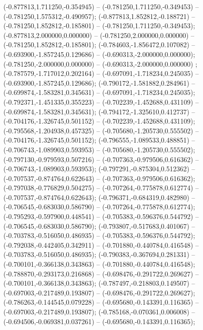 (-0.877813,1.711250,-0.354945) -- (-0.781250,1.711250,-0.349453) -- (-0.781250,1.575312,-0.490957);
 (-0.877813,1.852812,-0.188721) -- (-0.781250,1.852812,-0.185801) -- (-0.781250,1.711250,-0.349453);
 (-0.877813,2.000000,0.000000) -- (-0.781250,2.000000,0.000000) -- (-0.781250,1.852812,-0.185801);
 (-0.784603,-1.856472,0.107082) -- (-0.693900,-1.857245,0.129686) -- (-0.690313,-2.000000,0.000000);
 (-0.781250,-2.000000,0.000000) -- (-0.690313,-2.000000,0.000000) ;
 (-0.787579,-1.717012,0.202164) -- (-0.697091,-1.718234,0.245035) -- (-0.693900,-1.857245,0.129686);
 (-0.790172,-1.581882,0.284961) -- (-0.699874,-1.583281,0.345631) -- (-0.697091,-1.718234,0.245035);
 (-0.792371,-1.451335,0.355223) -- (-0.702239,-1.452688,0.431109) -- (-0.699874,-1.583281,0.345631);
 (-0.794172,-1.325610,0.412737) -- (-0.704176,-1.326745,0.501152) -- (-0.702239,-1.452688,0.431109);
 (-0.795568,-1.204938,0.457325) -- (-0.705680,-1.205730,0.555502) -- (-0.704176,-1.326745,0.501152);
 (-0.796555,-1.089533,0.488851) -- (-0.706743,-1.089903,0.593953) -- (-0.705680,-1.205730,0.555502);
 (-0.797130,-0.979593,0.507216) -- (-0.707363,-0.979506,0.616362) -- (-0.706743,-1.089903,0.593953);
 (-0.797291,-0.875304,0.512362) -- (-0.707537,-0.874764,0.622643) -- (-0.707363,-0.979506,0.616362);
 (-0.797038,-0.776829,0.504275) -- (-0.707264,-0.775878,0.612774) -- (-0.707537,-0.874764,0.622643);
 (-0.796371,-0.684319,0.482980) -- (-0.706545,-0.683030,0.586790) -- (-0.707264,-0.775878,0.612774);
 (-0.795293,-0.597900,0.448541) -- (-0.705383,-0.596376,0.544792) -- (-0.706545,-0.683030,0.586790);
 (-0.793807,-0.517683,0.401067) -- (-0.703783,-0.516050,0.486935) -- (-0.705383,-0.596376,0.544792);
 (-0.792038,-0.442405,0.342911) -- (-0.701880,-0.440784,0.416548) -- (-0.703783,-0.516050,0.486935);
 (-0.790383,-0.367694,0.281331) -- (-0.700101,-0.366138,0.343863) -- (-0.701880,-0.440784,0.416548);
 (-0.788870,-0.293173,0.216868) -- (-0.698476,-0.291722,0.269627) -- (-0.700101,-0.366138,0.343863);
 (-0.787497,-0.218803,0.149507) -- (-0.697003,-0.217489,0.193807) -- (-0.698476,-0.291722,0.269627);
 (-0.786263,-0.144545,0.079228) -- (-0.695680,-0.143391,0.116365) -- (-0.697003,-0.217489,0.193807);
 (-0.785168,-0.070361,0.006008) -- (-0.694506,-0.069381,0.037261) -- (-0.695680,-0.143391,0.116365);

